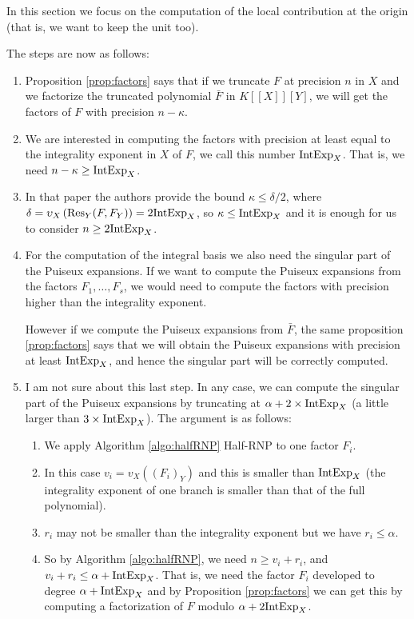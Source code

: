 \documentclass[a4paper,11pt,reqno]{amsart}%
\theoremstyle{definition}
\theoremstyle{plain}
\theoremstyle{remark}
\newcommand\ct[1]{\text{\rmfamily\upshape #1}}
\newcommand{\IntExpX}{\ct{IntExp}_X}
\begin{document}
In this section we focus on the computation of the local contribution at the origin (that is, we want to keep the unit too).

The steps are now as follows:
\begin{enumerate}
\item
Proposition \ref{prop:factors} says that if we truncate $F$ at precision $n$ in $X$ and we factorize the truncated polynomial $\bar F$ in $K[[X]][Y]$, we will get the factors of $F$ with precision $n - \kappa$.

\item
We are interested in computing the factors with precision at least equal to the integrality exponent in $X$ of $F$, we call this number $\IntExpX$. That is, we need
$n - \kappa \ge \IntExpX$.

\item In that paper the authors provide the bound $\kappa \le \delta / 2$, where $\delta = \upsilon_X \left( \operatorname{Res}_Y(F, F_Y) \right) = 2 \IntExpX$, so $\kappa \le \IntExpX$ and it is enough for us to consider $n \ge 2 \IntExpX$.

\item
For the computation of the integral basis we also need the singular part of the Puiseux expansions. If we want to compute the Puiseux expansions from the factors $F_1, \dots, F_s$, we would need to compute the factors with precision higher than the integrality exponent.

However if we compute the Puiseux expansions from $\bar F$, the same proposition \ref{prop:factors} says that we will obtain the Puiseux expansions with precision at least $\IntExpX$, and hence the singular part will be correctly computed.

\item I am not sure about this last step. In any case, we can compute the singular part of the Puiseux expansions by truncating at $\alpha + 2 \times \IntExpX$ (a little larger than $3 \times \IntExpX$). The argument is as follows:

    \begin{enumerate}
    \item We apply Algorithm \ref{algo:halfRNP} Half-RNP to one factor $F_i$.
    \item In this case $v_i = v_X({(F_i)}_Y)$ and this is smaller than $\IntExpX$ (the integrality exponent of one branch is smaller than that of the full polynomial).
    \item $r_i$ may not be smaller than the integrality exponent but we have $r_i \le \alpha$.
    \item So by Algorithm  \ref{algo:halfRNP}, we need $n \ge v_i + r_i$, and $v_i + r_i \le \alpha + \IntExpX$. That is, we need the factor $F_i$ developed to degree $\alpha + \IntExpX$ and by Proposition \ref{prop:factors} we can get this by computing a factorization of $F$ modulo $\alpha + 2 \IntExpX$.
    \end{enumerate}


\end{enumerate}
\end{document}
